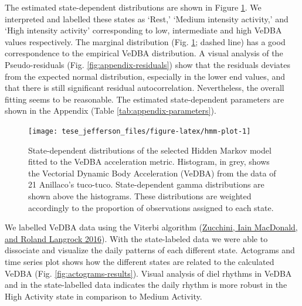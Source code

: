 \documentclass[english,msc,numbers,hidelinks]{coppe}
\begin{document}
  The estimated state-dependent distributions are shown in Figure \ref{fig:hmm-plot}. We interpreted and labelled these states as `Rest,' `Medium intensity activity,' and `High intensity activity' corresponding to low, intermediate and high VeDBA values respectively. The marginal distribution (Fig. \ref{fig:hmm-plot}; dashed line) has a good correspondence to the empirical VeDBA distribution. A visual analysis of the Pseudo-residuals (Fig. \ref{fig:appendix-residuals}) show that the residuals deviates from the expected normal distribution, especially in the lower end values, and that there is still significant residual autocorrelation. Nevertheless, the overall fitting seems to be reasonable. The estimated state-dependent parameters are shown in the Appendix (Table \ref{tab:appendix-parameters}).
  \begin{figure}

  {\centering \texttt{[image: tese\_jefferson\_files/figure-latex/hmm-plot-1]} 

  }

  \caption{State-dependent distributions of the selected Hidden Markov model fitted to the VeDBA acceleration metric. Histogram, in grey, shows the Vectorial Dynamic Body Acceleration (VeDBA) from the data of 21 Anillaco's tuco-tuco. State-dependent gamma distributions are shown above the histograms. These distributions are weighted accordingly to the proportion of observations assigned to each state.}\label{fig:hmm-plot}
  \end{figure}
  We labelled VeDBA data using the Viterbi algorithm (\protect\hyperlink{ref-zucchini2016}{Zucchini, Iain MacDonald, and Roland Langrock 2016}). With the state-labeled data we were able to dissociate and visualize the daily patterns of each different state. Actograms and time series plot shows how the different states are related to the calculated VeDBA (Fig. \ref{fig:actograms-results}). Visual analysis of diel rhythms in VeDBA and in the state-labelled data indicates the daily rhythm is more robust in the High Activity state in comparison to Medium Activity.
\end{document}
